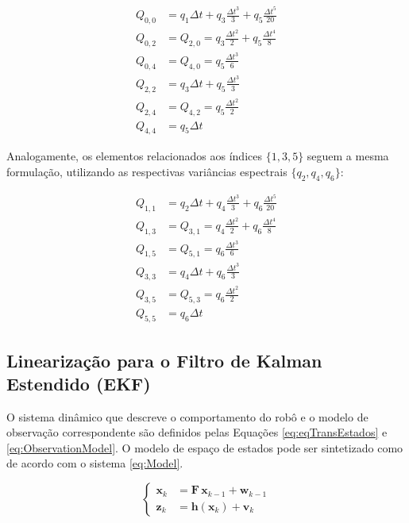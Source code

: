 \documentclass[journal]{IEEEtran}
\begin{document}
\begin{equation}
\begin{aligned}
    Q_{0,0} &= q_1 \Delta t + q_3 \frac{\Delta t^3}{3} + q_5 \frac{\Delta t^5}{20} \\
    Q_{0,2} &= Q_{2,0} = q_3 \frac{\Delta t^2}{2} + q_5 \frac{\Delta t^4}{8} \\
    Q_{0,4} &= Q_{4,0} = q_5 \frac{\Delta t^3}{6} \\
    Q_{2,2} &= q_3 \Delta t + q_5 \frac{\Delta t^3}{3} \\
    Q_{2,4} &= Q_{4,2} = q_5 \frac{\Delta t^2}{2} \\
    Q_{4,4} &= q_5 \Delta t
\end{aligned}
\end{equation}

Analogamente, os elementos relacionados aos índices $\{1, 3, 5\}$ seguem a mesma formulação, utilizando as respectivas variâncias espectrais $\{q_2, q_4, q_6\}$:

\begin{equation}
\begin{aligned}
    Q_{1,1} &= q_2 \Delta t + q_4 \frac{\Delta t^3}{3} + q_6 \frac{\Delta t^5}{20} \\
    Q_{1,3} &= Q_{3,1} = q_4 \frac{\Delta t^2}{2} + q_6 \frac{\Delta t^4}{8} \\
    Q_{1,5} &= Q_{5,1} = q_6 \frac{\Delta t^3}{6} \\
    Q_{3,3} &= q_4 \Delta t + q_6 \frac{\Delta t^3}{3} \\
    Q_{3,5} &= Q_{5,3} = q_6 \frac{\Delta t^2}{2} \\
    Q_{5,5} &= q_6 \Delta t
\end{aligned}
\end{equation}

\subsection{Linearização para o Filtro de Kalman Estendido (EKF)}

O sistema dinâmico que descreve o comportamento do robô e o modelo de observação correspondente são definidos pelas Equações \eqref{eq:eqTransEstados} e \eqref{eq:ObservationModel}. O modelo de espaço de estados pode ser sintetizado como de acordo com o sistema \eqref{eq:Model}.

\begin{equation}
    \label{eq:Model}
\begin{cases}
    \mathbf{x}_k &= \mathbf{F} \,\mathbf{x}_{k-1} + \mathbf{w}_{k-1} \\ 
    \mathbf{z}_k &= \mathbf{h}(\mathbf{x}_k) + \mathbf{v}_k      
\end{cases}    
\end{equation}
\end{document}
